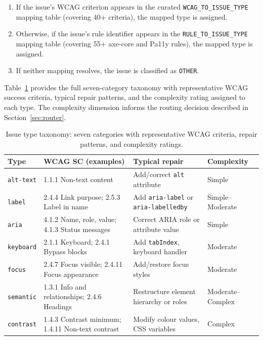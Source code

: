 \begin{enumerate}
  \item If the issue's WCAG criterion appears in the curated
    \texttt{WCAG\_TO\_ISSUE\_TYPE} mapping table (covering 40+ criteria),
    the mapped type is assigned.
  \item Otherwise, if the issue's rule identifier appears in the
    \texttt{RULE\_TO\_ISSUE\_TYPE} mapping table (covering 55+ axe-core and
    Pa11y rules), the mapped type is assigned.
  \item If neither mapping resolves, the issue is classified as
    \texttt{OTHER}.
\end{enumerate}

\noindent
Table~\ref{tab:issue_types} provides the full seven-category taxonomy with
representative WCAG success criteria, typical repair patterns, and the
complexity rating assigned to each type.  The complexity dimension informs the
routing decision described in Section~\ref{sec:router}.

\begin{table}[htbp]
\caption{Issue type taxonomy: seven categories with representative WCAG
  criteria, repair patterns, and complexity ratings.}
\label{tab:issue_types}
\centering\small
\renewcommand{\arraystretch}{1.3}
\begin{tabular}{lp{}p{}p{}}
\toprule
\textbf{Type} & \textbf{WCAG SC (examples)} & \textbf{Typical repair} & \textbf{Complexity} \\
\midrule
\texttt{alt-text}  & 1.1.1 Non-text content
  & Add/correct \texttt{alt} attribute & Simple \\
\texttt{label}     & 2.4.4 Link purpose; 2.5.3 Label in name
  & Add \texttt{aria-label} or \texttt{aria-labelledby} & Simple--Moderate \\
\texttt{aria}      & 4.1.2 Name, role, value; 4.1.3 Status messages
  & Correct ARIA role or attribute value & Simple \\
\texttt{keyboard}  & 2.1.1 Keyboard; 2.4.1 Bypass blocks
  & Add \texttt{tabIndex}, keyboard handler & Moderate \\
\texttt{focus}     & 2.4.7 Focus visible; 2.4.11 Focus appearance
  & Add/restore focus styles & Moderate \\
\texttt{semantic}  & 1.3.1 Info and relationships; 2.4.6 Headings
  & Restructure element hierarchy or roles & Moderate--Complex \\
\texttt{contrast}  & 1.4.3 Contrast minimum; 1.4.11 Non-text contrast
  & Modify colour values, CSS variables & Complex \\
\bottomrule
\end{tabular}
\end{table}

